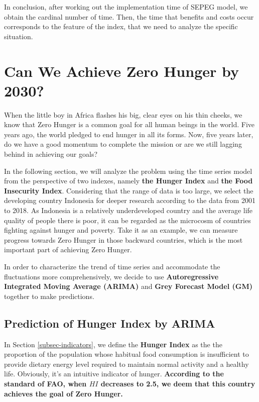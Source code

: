 \documentclass{mcmthesis}
\begin{document}
In conclusion, after working out the implementation time of SEPEG model, we obtain the cardinal number of time. Then, the time that benefits and costs occur corresponds to the feature of the index, that we need to analyze the specific situation.

\section{Can We Achieve Zero Hunger by 2030?}
When the little boy in Africa flashes his big, clear eyes on his thin cheeks, we know that Zero Hunger is a common goal for all human beings in the world. Five years ago, the world pledged to end hunger in all its forms. Now, five years later, do we have a good momentum to complete the mission or are we still lagging behind in achieving our goals?  

In the following section, we will analyze the problem using the time series model from the perspective of two indexes, namely \textbf{the Hunger Index} and \textbf{the Food Insecurity Index}. Considering that the range of data is too large, we select the developing country Indonesia for deeper research according to the data from 2001 to 2018. As Indonesia is a relatively underdeveloped country and the average life quality of people there is poor, it can be regarded as the microcosm of countries fighting against hunger and poverty. Take it as an example,  we can measure progress towards Zero Hunger in those backward countries, which is the most important part of achieving Zero Hunger.

In order to characterize the trend of time series and accommodate the fluctuations more comprehensively, we decide to use \textbf{Autoregressive Integrated Moving Average (ARIMA)} and \textbf{Grey Forecast Model (GM)} together to make predictions.


\subsection{Prediction of Hunger Index by ARIMA}

In Section \ref{subsec-indicators}, we define the \textbf{Hunger Index} as the the proportion of the population whose habitual food consumption is insufficient to provide dietary energy level required to maintain normal activity and a healthy life. Obviously, it's an intuitive indicator of hunger. \textbf{According to the standard of FAO, when $HI$ decreases to 2.5, we deem that this country achieves the goal of Zero Hunger.}
\end{document}
